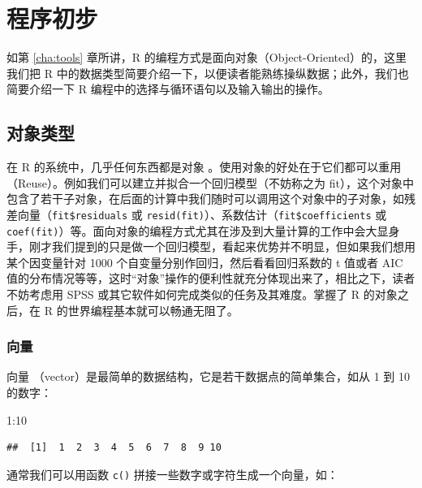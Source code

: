 \documentclass[
  b5paper,
  UTF8,twoside]{book}
\newenvironment{Shaded}{\begin{snugshade}}{\end{snugshade}}
\newcommand{\DecValTok}[1]{\textcolor[rgb]{0.00,0.00,0.81}{#1}}
\newcommand{\SpecialCharTok}[1]{\textcolor[rgb]{0.00,0.00,0.00}{#1}}
\begin{document}
\hypertarget{appendix}{%
\appendix}


\hypertarget{chap:programming}{%
\chapter{程序初步}\label{chap:programming}}

如第 \ref{cha:tools} 章所讲，R 的编程方式是面向对象（Object-Oriented）的，这里我们把 R 中的数据类型简要介绍一下，以便读者能熟练操纵数据；此外，我们也简要介绍一下 R 编程中的选择与循环语句以及输入输出的操作。

\hypertarget{sec:object}{%
\section{对象类型}\label{sec:object}}

在 R 的系统中，几乎任何东西都是对象 。使用对象的好处在于它们都可以重用（Reuse）。例如我们可以建立并拟合一个回归模型（不妨称之为 fit），这个对象中包含了若干子对象，在后面的计算中我们随时可以调用这个对象中的子对象，如残差向量（\texttt{fit\$residuals} 或 \texttt{resid(fit)}）、系数估计（\texttt{fit\$coefficients} 或 \texttt{coef(fit)}）等。面向对象的编程方式尤其在涉及到大量计算的工作中会大显身手，刚才我们提到的只是做一个回归模型，看起来优势并不明显，但如果我们想用某个因变量针对 1000 个自变量分别作回归，然后看看回归系数的 t 值或者 AIC 值的分布情况等等，这时``对象''操作的便利性就充分体现出来了，相比之下，读者不妨考虑用 SPSS 或其它软件如何完成类似的任务及其难度。掌握了 R 的对象之后，在 R 的世界编程基本就可以畅通无阻了。

\hypertarget{ux5411ux91cf}{%
\subsection{向量}\label{ux5411ux91cf}}

向量 （vector）是最简单的数据结构，它是若干数据点的简单集合，如从 1 到 10 的数字：

\begin{Shaded}
\begin{Highlighting}[]
\DecValTok{1}\SpecialCharTok{:}\DecValTok{10}
\end{Highlighting}
\end{Shaded}

\begin{verbatim}
##  [1]  1  2  3  4  5  6  7  8  9 10
\end{verbatim}

通常我们可以用函数 \texttt{c()} 拼接一些数字或字符生成一个向量，如：
\end{document}

